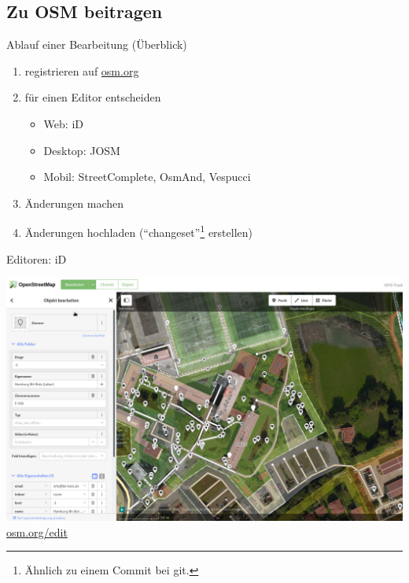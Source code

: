 \documentclass{beamer}
\begin{document}
		\subsection{Zu OSM beitragen}
		
			\begin{frame}{Ablauf einer Bearbeitung (Überblick)}
				\begin{enumerate}
					\item registrieren auf \href{https://www.openstreetmap.org/user/new}{osm.org}\pause
					\item für einen Editor entscheiden
					\begin{itemize}
						\item Web: iD
						\item Desktop: JOSM
						\item Mobil: StreetComplete, OsmAnd, Vespucci
					\end{itemize}\pause
					\item Änderungen machen\pause
					\item Änderungen hochladen (\enquote{changeset}\footnote{Ähnlich zu einem Commit bei git.} erstellen)
				\end{enumerate}
			\end{frame}
			
			\begin{frame}{Editoren: iD}
				\begin{center}
					\includegraphics[height=0.75\textheight]{images/id-editor.jpg}
					\href{https://www.openstreetmap.org/edit}{osm.org/edit}
				\end{center}
			\end{frame}
			
\end{document}

